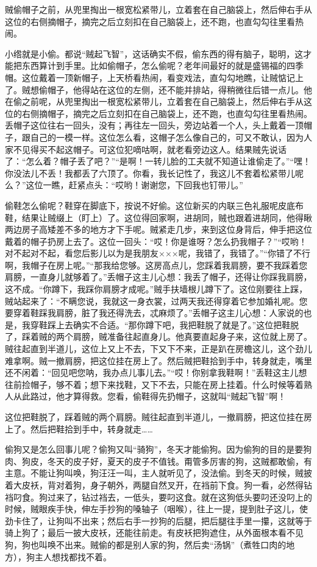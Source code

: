 \documentclass[12pt,UTF8]{ctexbook}
\begin{document}
贼偷帽子之前，从兜里掏出一根宽松紧带儿，立着套在自己脑袋上，然后伸右手从这位的右侧摘帽子，摘完之后立刻扣在自己脑袋上，还不跑，也直勾勾往里看热闹。



小绺就是小偷。都说“贼起飞智”，这话确实不假，偷东西的得有脑子，聪明，这才能把东西算计到手里。比如偷帽子，怎么偷呢？老年间最好的就是盛锡福的四季帽。这位戴着一顶新帽子，上天桥看热闹，看变戏法，直勾勾地瞧，让贼惦记上了。贼想偷帽子，他得站在这位的左侧，还不能并排站，得稍微往后错一点儿。他在偷之前呢，从兜里掏出一根宽松紧带儿，立着套在自己脑袋上，然后伸右手从这位的右侧摘帽子，摘完之后立刻扣在自己脑袋上，还不跑，也直勾勾往里看热闹。丢帽子这位往右一回头，没有；再往左一回头，旁边站着一个人，头上戴着一顶帽子，跟自己的一模一样。这位怎么看，这帽子怎么像自己的，可又不敢认，因为人家不见得买不起这帽子。可这位犯嘀咕啊，就老看旁边这人。结果贼先说话了：“怎么着？帽子丢了吧？”“是啊！一转儿脸的工夫就不知道让谁偷走了。”“嘿！你没法儿不丢！我都丢了六顶了。你看，我长记性了，我这儿不套着松紧带儿呢么？”这位一瞧，赶紧点头：“哎哟！谢谢您，下回我也钉带儿。”

偷鞋怎么偷呢？鞋穿在脚底下，按说不好偷。这位新买的内联三色礼服呢皮底布鞋，结果让贼缀上（盯上）了。这位得回家啊，进胡同，贼也跟着进胡同，他得瞅两边房子高矮差不多的地方才下手呢。贼紧走几步，来到这位身背后，伸手把这位戴着的帽子扔房上去了。这位一回头：“哎！你是谁呀？怎么扔我帽子？”“哎哟！对不起对不起，看您后影儿以为是我朋友×××呢，我错了，我错了。”“你错了不行啊，我帽子在房上呢。”“那我给您够。这房高点儿，您踩着我肩膀，要不我踩着您肩膀，一直身儿就够着了。”丢帽子这主儿心想：我丢了帽子，还得让你踩我肩膀，这不成。“你蹲下，我踩你肩膀才成呢。”贼手扶墙根儿蹲下了。这位刚要往上踩，贼站起来了：“不瞒您说，我就这一身衣裳，过两天我还得穿着它参加婚礼呢。您要穿着鞋踩我肩膀，脏了我还得洗去，忒麻烦了。”丢帽子这主儿心想：人家说的也是，我穿鞋踩上去确实不合适。“那你蹲下吧，我把鞋脱了就是了。”这位把鞋脱了，踩着贼的两个肩膀，贼准备往起直身儿。他真要直起身子来，这位就上房了。贼往起直到半道儿，这位上又上不去，下又下不来，正是趴在房檐这儿，这个劲儿难拿啊。贼一撤肩膀，把这位挂在房上了。然后贼把鞋拾到手中，转身就走，嘴里还不闲着：“回见吧您呐，我办点儿事儿去。”“哎！你别拿我鞋啊！”丢鞋这主儿想往前捡帽子，够不着；想下来找鞋，又下不去，只能在房上挂着。什么时候等着熟人从此路过，他才算得救。您看，偷鞋得先扔帽子，这就叫“贼起飞智”啊！

这位把鞋脱了，踩着贼的两个肩膀。贼往起直到半道儿，一撤肩膀，把这位挂在房上了。然后把鞋拾到手中，转身就走……



偷狗又是怎么回事儿呢？偷狗又叫“骑狗”，冬天才能偷狗。因为偷狗的目的是要狗肉、狗皮，冬天的皮子好，夏天的皮子不值钱。甭管多厉害的狗，这贼都敢偷，有主意。不能让狗叫唤，狗汪汪一叫，主人就听见了，没法偷。到冬天的时候，贼披着大皮袄，背对着狗，身子朝外，两腿自然叉开，在裆前下食。狗一看，必然得钻裆叼食。狗过来了，钻过裆去，一低头，要叼这食。就在这狗低头要叼还没叼上的时候，贼眼疾手快，伸左手抄狗的嗓轴子（咽喉），往上一提，提到肚子这儿，使劲卡住了，让狗叫不出来；然后右手一抄狗的后腿，把后腿往手里一攥，这就等于骑上狗了；最后一披大皮袄，还能往前走。有皮袄把狗遮住，从外面根本看不见狗，狗也叫唤不出来。贼偷的都是别人家的狗，然后卖“汤锅”（煮牲口肉的地方），狗主人想找都找不着。
\end{document}
